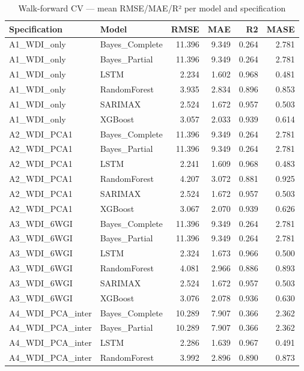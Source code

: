 \begin{table}
\caption{Walk-forward CV — mean RMSE/MAE/R² per model and specification}
\label{tab:performance}
\begin{tabular}{llrrrr}
\toprule
Specification & Model & RMSE & MAE & R2 & MASE \\
\midrule
A1\_WDI\_only & Bayes\_Complete & 11.396 & 9.349 & 0.264 & 2.781 \\
A1\_WDI\_only & Bayes\_Partial & 11.396 & 9.349 & 0.264 & 2.781 \\
A1\_WDI\_only & LSTM & 2.234 & 1.602 & 0.968 & 0.481 \\
A1\_WDI\_only & RandomForest & 3.935 & 2.834 & 0.896 & 0.853 \\
A1\_WDI\_only & SARIMAX & 2.524 & 1.672 & 0.957 & 0.503 \\
A1\_WDI\_only & XGBoost & 3.057 & 2.033 & 0.939 & 0.614 \\
A2\_WDI\_PCA1 & Bayes\_Complete & 11.396 & 9.349 & 0.264 & 2.781 \\
A2\_WDI\_PCA1 & Bayes\_Partial & 11.396 & 9.349 & 0.264 & 2.781 \\
A2\_WDI\_PCA1 & LSTM & 2.241 & 1.609 & 0.968 & 0.483 \\
A2\_WDI\_PCA1 & RandomForest & 4.207 & 3.072 & 0.881 & 0.925 \\
A2\_WDI\_PCA1 & SARIMAX & 2.524 & 1.672 & 0.957 & 0.503 \\
A2\_WDI\_PCA1 & XGBoost & 3.067 & 2.070 & 0.939 & 0.626 \\
A3\_WDI\_6WGI & Bayes\_Complete & 11.396 & 9.349 & 0.264 & 2.781 \\
A3\_WDI\_6WGI & Bayes\_Partial & 11.396 & 9.349 & 0.264 & 2.781 \\
A3\_WDI\_6WGI & LSTM & 2.324 & 1.673 & 0.966 & 0.500 \\
A3\_WDI\_6WGI & RandomForest & 4.081 & 2.966 & 0.886 & 0.893 \\
A3\_WDI\_6WGI & SARIMAX & 2.524 & 1.672 & 0.957 & 0.503 \\
A3\_WDI\_6WGI & XGBoost & 3.076 & 2.078 & 0.936 & 0.630 \\
A4\_WDI\_PCA\_inter & Bayes\_Complete & 10.289 & 7.907 & 0.366 & 2.362 \\
A4\_WDI\_PCA\_inter & Bayes\_Partial & 10.289 & 7.907 & 0.366 & 2.362 \\
A4\_WDI\_PCA\_inter & LSTM & 2.286 & 1.639 & 0.967 & 0.491 \\
A4\_WDI\_PCA\_inter & RandomForest & 3.992 & 2.896 & 0.890 & 0.873 \\

\end{tabular}
\end{table}
